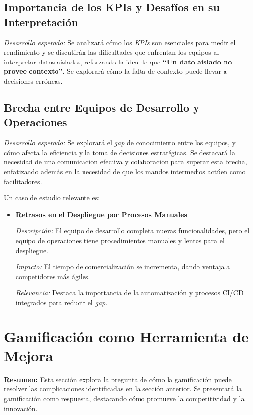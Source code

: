 \documentclass[journal]{IEEEtran}
\begin{document}
\subsection{\textbf{ Importancia de los KPIs y Desafíos en su Interpretación}}

\textit{Desarrollo esperado:} Se analizará cómo los \textit{KPIs} son esenciales para medir el rendimiento y se discutirán las dificultades que enfrentan los equipos al interpretar datos aislados, reforzando la idea de que \textbf{``Un dato aislado no provee contexto''}. Se explorará cómo la falta de contexto puede llevar a decisiones erróneas.

\subsection{\textbf{ Brecha entre Equipos de Desarrollo y Operaciones}}

\textit{Desarrollo esperado:} Se explorará el \textit{gap} de conocimiento entre los equipos, y cómo afecta la eficiencia y la toma de decisiones estratégicas. Se destacará la necesidad de una comunicación efectiva y colaboración para superar esta brecha, enfatizando además en la necesidad de que los mandos intermedios actúen como facilitadores.

Un caso de estudio relevante es:

\begin{itemize}
    \item \textbf{Retrasos en el Despliegue por Procesos Manuales}
    
    \textit{Descripción:} El equipo de desarrollo completa nuevas funcionalidades, pero el equipo de operaciones tiene procedimientos manuales y lentos para el despliegue.
    
    \textit{Impacto:} El tiempo de comercialización se incrementa, dando ventaja a competidores más ágiles.
    
    \textit{Relevancia:} Destaca la importancia de la automatización y procesos CI/CD integrados para reducir el \textit{gap}.
\end{itemize}

\section{\textbf{\Large Gamificación como Herramienta de Mejora}}

\textbf{Resumen:} Esta sección explora la pregunta de cómo la gamificación puede resolver las complicaciones identificadas en la sección anterior. Se presentará la gamificación como respuesta, destacando cómo promueve la competitividad y la innovación.
\end{document}
